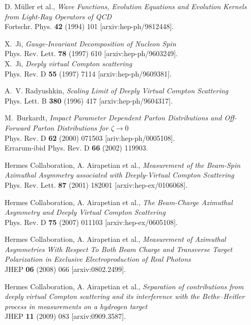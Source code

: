 \documentclass[11pt,a4paper]{article}
\begin{document}

\begin{thebibliography}{10}
D. M\"uller et al., \emph{Wave Functions, Evolution Equations and Evolution Kernels from Light-Ray Operators of QCD}
\\Fortschr. Phys. {\bf 42} (1994) 101 [arxiv:hep-ph/9812448]. 

X.~Ji, \emph{Gauge-Invariant Decomposition of Nucleon Spin}
\\Phys. Rev. Lett. {\bf 78} (1997) 610 [arxiv:hep-ph/9603249].\\

X.~Ji, \emph{Deeply virtual Compton scattering}
\\Phys. Rev. D \textbf{55} (1997) 7114 [arxiv:hep-ph/9609381].

A.~V. Radyushkin, \emph{Scaling Limit of Deeply Virtual Compton Scattering}
\\Phys. Lett. B \textbf{380} (1996) 417 [arxiv:hep-ph/9604317].

M.~Burkardt, \emph{Impact Parameter Dependent Parton Distributions and Off-Forward Parton Distributions for $\zeta\to 0$}
\\Phys. Rev. D \textbf{62} (2000) 071503 [ariv:hep-ph/0005108].
\\Errarum-ibid Phys. Rev. D \textbf{66} (2002) 119903. 

H{\sc ermes} Collaboration, A. Airapetian et al., \emph{Measurement of the Beam-Spin Azimuthal Asymmetry associated with Deeply-Virtual Compton Scattering}
\\Phys. Rev. Lett. \textbf{87} (2001) 182001 [arxiv:hep-ex/0106068].

H{\sc ermes} Collaboration, A. Airapetian et al., \emph{The Beam-Charge Azimuthal Asymmetry and Deeply Virtual Compton Scattering }
\\Phys. Rev. D \textbf{75} (2007) 011103 [arxiv:hep-ex/0605108].

H{\sc ermes} Collaboration, A. Airapetian et al., \emph{Measurement of Azimuthal Asymmetries With Respect To Both Beam Charge and Transverse Target Polarization in Exclusive Electroproduction of Real Photons}
\\JHEP \textbf{06} (2008) 066 [arxiv:0802.2499].

H{\sc ermes} Collaboration, A. Airapetian et al., \emph{Separation of contributions from deeply virtual Compton scattering and its interference with the Bethe--Heitler process in measurements on a hydrogen target}
\\JHEP {\bf 11} (2009) 083 [arxiv:0909.3587].


\end{thebibliography}
\end{document}
